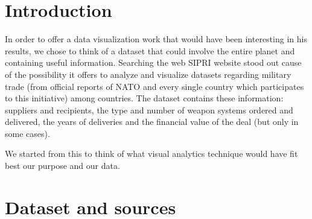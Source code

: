\documentclass{article}
\begin{document}
\begin{multicols}{2}

\section{Introduction}
%
In order to offer a data visualization work that would have been interesting in his results, we chose to think of a dataset that could involve the entire planet and containing useful information. Searching the web SIPRI website stood out cause of the possibility it offers to analyze and visualize datasets regarding military trade (from official reports of NATO and every single country which participates to this initiative) among countries. The dataset contains these information: suppliers and recipients, the type and number of weapon systems ordered and delivered, the years of deliveries and the financial value of the deal (but only in some cases). 


We started from this to think of what visual analytics technique would have fit best our purpose and our data.



\section{Dataset and sources}
%



\end{multicols}
\end{document}
